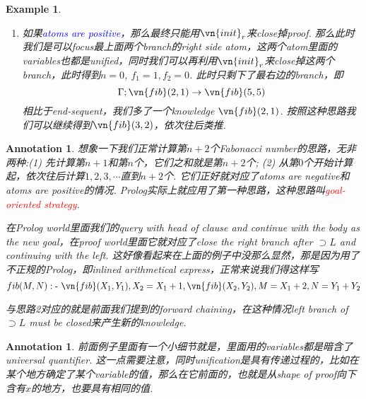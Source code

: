 \documentclass{article}
\theoremstyle{plain}
\newtheorem{example}[theorem]{Example}
\newtheorem{annotation}[theorem]{Annotation}
\theoremstyle{nonumberplain}
\newcommand{\redt}[1]{\textcolor{red}{#1}}
\newcommand{\bluet}[1]{\textcolor{blue}{#1}}
\begin{document}
\begin{example}
\begin{itemize}
\begin{enumerate}
		\[
			\Gamma;\cdot \to \vn{fib}(4, x)~\text{and}~\Gamma;\cdot \to \vn{fib}(3,5-x)~~~~~~\text{iter-con}
		\]
		它们和我们end-sequent是非常像的，我们可以用前面的步骤分别在对它们再做一次derivation，对于$\vn{fib}(4,x)$，利用iter-con显然我们可以得到
		\[
			\Gamma;\cdot \to \vn{fib}(3,y)~\text{and}~\Gamma;\cdot \to \vn{fib}(2,x-y)	
		\]
		对于$\vn{fib}(3, 5-x)$同理有
		\[
			\Gamma;\cdot \to \vn{fib}(2,z)~\text{and}~\Gamma;\cdot \to \bluet{\vn{fib}(1, 5-x-z)}
		\]
		可以看到直到$\vn{fib}(1,0)$或者$\vn{fib}(0,0)$才会停止. 这背后本质就是如果我要计算第5个Fabonacci number, 那么我得先计算第4个Fabonacci number和第3个Fabonacci number.
		\item 如果\bluet{atoms are positive}，那么最终只能用$\vn{init}_r$来close掉proof. 那么此时我们是可以focus最上面两个branch的right side atom，这两个atom里面的variables也都是unified，同时我们可以再利用$\vn{init}_r$来close掉这两个branch，此时得到$n = 0$, $f_1 = 1, f_2 = 0$. 此时只剩下了最右边的branch，即
		\[
			\Gamma;\vn{fib}(2,1) \to \vn{fib}(5,5) 
		\]
		相比于end-sequent，我们多了一个knowledge $\vn{fib}(2,1)$. 按照这种思路我们可以继续得到$\vn{fib}(3,2)$，依次往后类推.
	\end{enumerate}
\end{itemize}
\end{example}


\begin{annotation}
\rm 想象一下我们正常计算第$n+2$个Fabonacci number的思路，无非两种:(1) 先计算第$n+1$和第$n$个，它们之和就是第$n+2$个; (2) 从第$0$个开始计算起，依次往后计算$1,2,3,\cdots$直到$n+2$个. 它们正好就对应了atoms are negative和atoms are positive的情况. Prolog实际上就应用了第一种思路，这种思路叫\redt{goal-oriented strategy}. 

在Prolog world里面我们的query with head of clause and continue with the body as the new goal，在proof world里面它就对应了close the right branch after $\supset L$ and continuing with the left. 这好像看起来在上面的例子中没那么显然，那是因为用了不正规的Prolog，即inlined arithmetical express，正常来说我们得这样写
$$
fib(M,N) :\text{-}~ \vn{fib}(X_1, Y_1), X_2 = X_1 + 1, \vn{fib}(X_2, Y_2), M =X_1 + 2, N = Y_1 + Y_2 
$$

与思路2对应的就是前面我们提到的forward chaining，在这种情况left branch of $\supset L$ must be closed来产生新的knowledge. 
\end{annotation}

\begin{annotation}
\rm 前面例子里面有一个小细节就是，里面用的variables都是暗含了universal quantifier. 这一点需要注意，同时unification是具有传递过程的，比如在某个地方确定了某个variable的值，那么在它前面的，也就是从shape of proof向下含有$x$的地方，也要具有相同的值.
\end{annotation}
\end{document}
